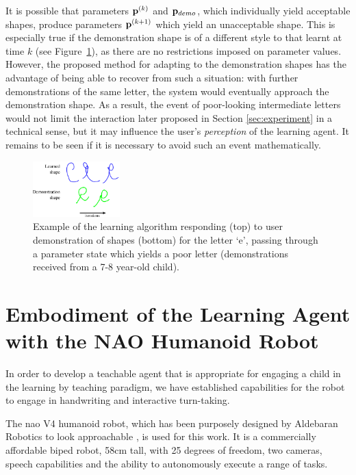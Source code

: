 \documentclass{sig-alternate}
\begin{document}
It is possible that parameters ${\bf p}^{(k)}$ and ${\bf p}_{demo}$, which
individually yield acceptable shapes, produce parameters ${\bf p}^{(k+1)}$ which
yield an unacceptable shape. This is especially true if the demonstration shape
is of a different style to that learnt at time $k$ (see Figure~\ref{fig:eDemo}),
as there are no restrictions imposed on parameter values. However, the proposed
method for adapting to the demonstration shapes has the advantage of being able
to recover from such a situation: with further demonstrations of the same
letter, the system would eventually approach the demonstration shape. As a
result, the event of poor-looking intermediate letters would not limit the
interaction later proposed in Section \ref{sec:experiment} in a technical sense,
but it may influence the user's \emph{perception} of the learning agent. It
remains to be seen if it is necessary to avoid such an event mathematically.

\begin{figure}[thpb]
    \centering
    \includegraphics[width=0.3\textwidth]{figures/learningEdemo}
    \caption{\label{fig:eDemo}Example of the learning algorithm responding (top)
    to user demonstration of shapes (bottom) for the letter `e', passing through
    a parameter state which yields a poor letter (demonstrations received from a 7-8
    year-old child).}
\end{figure}



\section{Embodiment of the Learning Agent with the NAO Humanoid Robot}
\label{sec:robotWriting}

In order to develop a teachable agent that is appropriate for engaging a child
in the learning by teaching paradigm, we have established capabilities for the
robot to engage in handwriting and interactive turn-taking.

The {\sc nao} V4 humanoid robot, which has been purposely designed by Aldebaran
Robotics to look approachable \cite{Gouaillier2008}, is used for this work. It
is a commercially affordable biped robot, 58cm tall, with 25 degrees of freedom,
two cameras, speech capabilities and the ability to autonomously execute a range
of tasks.
\end{document}
